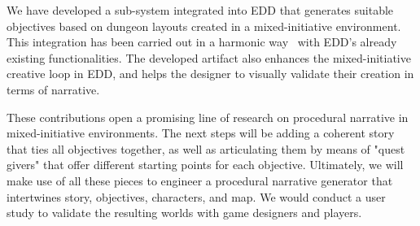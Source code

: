 We have developed a sub-system integrated into EDD that generates suitable objectives based on dungeon layouts created in a mixed-initiative environment. This integration has been carried out in a harmonic way~\cite{p7liapis2018orchestrating} with EDD's already existing functionalities.
The developed artifact also 
enhances the mixed-initiative creative loop in EDD, and helps the designer to visually validate their creation in terms of narrative. 

These contributions open a promising line of research on procedural narrative in mixed-initiative environments. The next steps will be adding a coherent story that ties all objectives together, as well as articulating them by means of "quest givers"
that offer different starting points for each objective. Ultimately, we will make use of all these pieces to engineer a procedural narrative generator that intertwines story, objectives, characters, and map. We would conduct a user study to validate the resulting worlds with game designers and players. 

